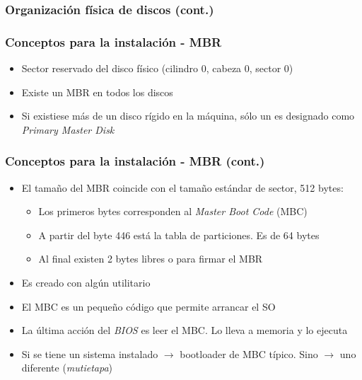 \begin{frame}
	\frametitle{Organización física de discos (cont.)}
	\begin{figure}
	\end{figure}
\end{frame}

\begin{frame}
	\frametitle{Conceptos para la instalación - \textbf{MBR}}
	\begin{itemize}
		\item Sector reservado del disco físico (cilindro 0, cabeza 0, sector 0)
		\item Existe un MBR en todos los discos
		\item Si existiese más de un disco rígido en la máquina, sólo un es designado como \textit{Primary Master Disk}
	\end{itemize}
\end{frame}

\begin{frame}
	\frametitle{Conceptos para la instalación - MBR (cont.)}
	\begin{itemize}
		\item El tamaño del MBR coincide con el tamaño estándar de sector, 512 bytes:
		\begin{itemize}
			\item Los primeros bytes corresponden al \textit{Master Boot Code} (MBC)
			\item A partir del byte 446 está la tabla de particiones. Es de 64 bytes
			\item Al final existen 2 bytes libres o para firmar el MBR
		\end{itemize}
		\item Es creado con algún utilitario	
		\item El MBC es un pequeño código que permite arrancar el SO
		\item La última acción del \textit{BIOS} es leer el MBC. Lo lleva a memoria y lo ejecuta		
		\item Si se tiene un sistema instalado $\rightarrow$ bootloader de MBC típico. Sino $\rightarrow$ uno diferente (\textit{mutietapa})		
	\end{itemize}
\end{frame}


